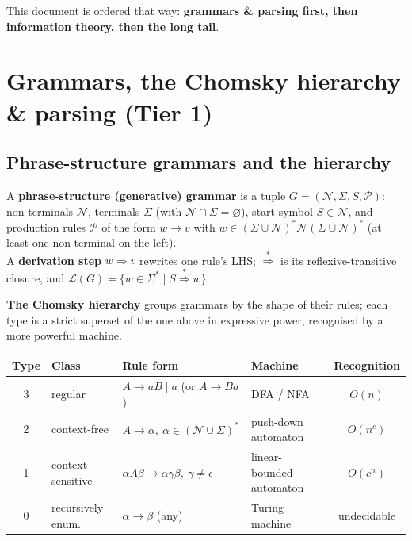 \documentclass[11pt,a4paper]{article}
\newcommand{\der}{\Rightarrow}
\newcommand{\ders}{\overset{*}{\Rightarrow}}
\begin{document}
This document is ordered that way: \textbf{grammars \& parsing first, then information theory, then the long tail}.

\hrulefill

\section{Grammars, the Chomsky hierarchy \& parsing (Tier 1)}

\subsection{Phrase-structure grammars and the hierarchy}

\begin{must}
A \textbf{phrase-structure (generative) grammar} is a tuple $G=(\mathcal N,\Sigma,S,\mathcal P)$: non-terminals $\mathcal N$, terminals $\Sigma$ (with $\mathcal N\cap\Sigma=\varnothing$), start symbol $S\in\mathcal N$, and production rules $\mathcal P$ of the form $w\to v$ with $w\in(\Sigma\cup\mathcal N)^*\mathcal N(\Sigma\cup\mathcal N)^*$ (at least one non-terminal on the left). \\[2pt]
A \textbf{derivation step} $w\der v$ rewrites one rule's LHS; $\ders$ is its reflexive-transitive closure, and $\mathcal L(G)=\{w\in\Sigma^*\mid S\ders w\}$.
\end{must}

\textbf{The Chomsky hierarchy} groups grammars by the shape of their rules; each type is a strict superset of the one above in expressive power, recognised by a more powerful machine.

\begin{center}
\begin{tabular}{clll c}
\hline
\textbf{Type} & \textbf{Class} & \textbf{Rule form} & \textbf{Machine} & \textbf{Recognition} \\
\hline
3 & regular & $A\to aB \mid a$ (or $A\to Ba$) & DFA / NFA & $O(n)$ \\
2 & context-free & $A\to\alpha,\ \alpha\in(\mathcal N\cup\Sigma)^*$ & push-down automaton & $O(n^c)$ \\
1 & context-sensitive & $\alpha A\beta\to\alpha\gamma\beta,\ \gamma\neq\epsilon$ & linear-bounded automaton & $O(c^n)$ \\
0 & recursively enum. & $\alpha\to\beta$ (any) & Turing machine & undecidable \\
\hline
\end{tabular}
\end{center}
\end{document}
